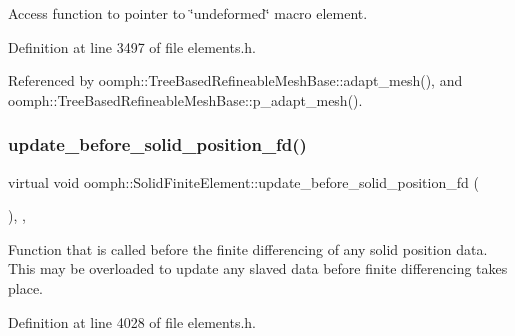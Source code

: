 Access function to pointer to \char`\"{}undeformed\char`\"{} macro element. 



Definition at line 3497 of file elements.\+h.



Referenced by oomph\+::\+Tree\+Based\+Refineable\+Mesh\+Base\+::adapt\+\_\+mesh(), and oomph\+::\+Tree\+Based\+Refineable\+Mesh\+Base\+::p\+\_\+adapt\+\_\+mesh().

\mbox{\label{classoomph_1_1SolidFiniteElement_a51bdd2b180335e3ad41c6b818a2528e2}} 
\subsubsection{\texorpdfstring{update\+\_\+before\+\_\+solid\+\_\+position\+\_\+fd()}{update\_before\_solid\_position\_fd()}}
{\footnotesize\ttfamily virtual void oomph\+::\+Solid\+Finite\+Element\+::update\+\_\+before\+\_\+solid\+\_\+position\+\_\+fd (\begin{DoxyParamCaption}{ }\end{DoxyParamCaption})\hspace{0.3cm}{\ttfamily [inline]}, {\ttfamily [protected]}, {\ttfamily [virtual]}}



Function that is called before the finite differencing of any solid position data. This may be overloaded to update any slaved data before finite differencing takes place. 



Definition at line 4028 of file elements.\+h.

\mbox{\label{classoomph_1_1SolidFiniteElement_a84d5c177b27570c35dd7693b913c00a5}} 
